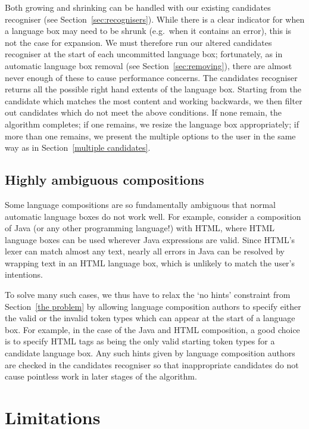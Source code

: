 \documentclass[sigplan,screen]{acmart}\settopmatter{printfolios=true,printccs=false,printacmref=false}
\begin{document}
Both growing and shrinking can be handled with our existing
candidates recogniser (see Section~\ref{sec:recognisers}).
While there is a clear indicator for when a language box may need to be shrunk
(e.g.~when it contains an error), this is not the case for expansion. We
must therefore run our altered candidates recogniser at the start of
each uncommitted language box; fortunately, as in automatic language box
removal (see Section~\ref{sec:removing}), there are almost never enough of
these to cause performance concerns. The candidates recogniser
returns all the possible right hand extents of the language box. Starting
from the candidate which matches the most content and working backwards, we then
filter out candidates which do not meet the above conditions. If none remain,
the algorithm completes; if one remains,
we resize the language box appropriately; if more than one remains, we present
the multiple options to the user in the same way as in Section~\ref{multiple candidates}.


\subsection{Highly ambiguous compositions}
\label{sec:highly ambiguous compositions}

Some language compositions are so fundamentally ambiguous that normal automatic
language boxes do not work well. For example, consider a composition of Java
(or any other programming language!) with HTML, where HTML language boxes can
be used wherever Java expressions are valid. Since HTML's lexer can match
almost any text, nearly all errors in Java can be resolved by wrapping text in
an HTML language box, which is unlikely to match the user's intentions.

To solve many such cases, we thus have to relax the `no hints' constraint from
Section~\ref{the problem} by allowing language composition authors to specify
either the valid or the invalid token types which can appear at the start of
a language box. For example, in the case of the Java and HTML composition, a
good choice is to specify HTML tags as being the only valid starting token
types for a candidate language box. Any such hints given by language composition authors
are checked in the candidates recogniser so that inappropriate candidates do
not cause pointless work in later stages of the algorithm.


\section{Limitations}
\label{sec:lbox_limitations}
\end{document}
